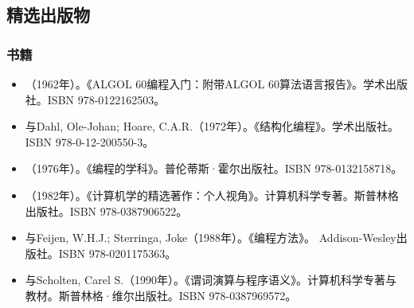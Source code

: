 \subsection{精选出版物}
\subsubsection{书籍}
\begin{itemize}
\item （1962年）。《ALGOL 60编程入门：附带ALGOL 60算法语言报告》。学术出版社。ISBN 978-0122162503。
\item 与Dahl, Ole-Johan; Hoare, C.A.R.（1972年）。《结构化编程》。学术出版社。ISBN 978-0-12-200550-3。
\item （1976年）。《编程的学科》。普伦蒂斯·霍尔出版社。ISBN 978-0132158718。
\item （1982年）。《计算机学的精选著作：个人视角》。计算机科学专著。斯普林格出版社。ISBN 978-0387906522。
\item 与Feijen, W.H.J.; Sterringa, Joke（1988年）。《编程方法》。 Addison-Wesley出版社。ISBN 978-0201175363。
\item 与Scholten, Carel S.（1990年）。《谓词演算与程序语义》。计算机科学专著与教材。斯普林格·维尔出版社。ISBN 978-0387969572。
\end{itemize}

